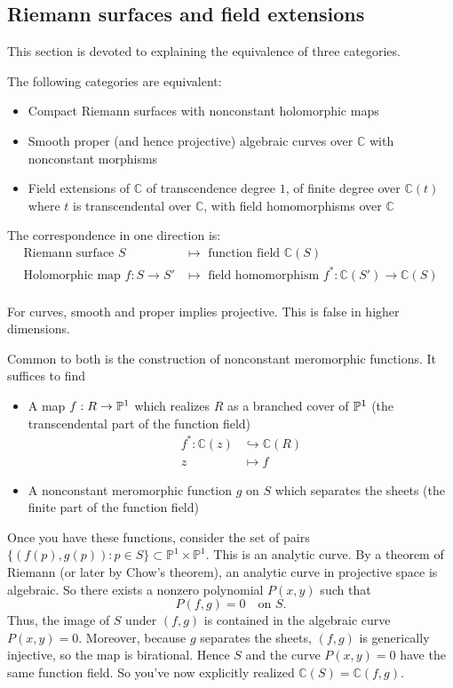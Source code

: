 \documentclass[12pt]{article}
\begin{document}
\subsection{Riemann surfaces and field extensions}
This section is devoted to explaining the equivalence of three categories.
\begin{theorem}
The following categories are equivalent:
\begin{itemize}
    \item Compact Riemann surfaces with nonconstant holomorphic maps
    \item Smooth proper (and hence projective) algebraic curves over $\mathbb{C}$ with nonconstant morphisms
    \item Field extensions of $\mathbb{C}$ of transcendence degree $1$, of finite degree over $\mathbb{C}(t)$ where $t$ is transcendental over $\mathbb{C}$, with field homomorphisms over $\mathbb{C}$
\end{itemize}

The correspondence in one direction is:
\begin{align*}
    \text{Riemann surface } S &\mapsto \text{ function field } \mathbb{C}(S) \\
    \text{Holomorphic map } f: S \to S' &\mapsto \text{ field homomorphism } f^*: \mathbb{C}(S') \to \mathbb{C}(S) \\
\end{align*}
\end{theorem}

\begin{remark}
    For curves, smooth and proper implies projective. This is false in higher dimensions.
\end{remark}

Common to both is the construction of nonconstant meromorphic functions. It suffices to find \begin{itemize}
    \item A map $f:R \to \P^1$ which realizes $R$ as a branched cover of $\P^1$ (the transcendental part of the function field) \begin{align*}
        f^*: \mathbb{C}(z) &\hookrightarrow \mathbb{C}(R) \\
        z &\mapsto f
    \end{align*}
    \item A nonconstant meromorphic function $g$ on $S$ which separates the sheets (the finite part of the function field)
\end{itemize}
Once you have these functions, consider the set of pairs $\{(f(p), g(p)) : p \in S\} \subset \mathbb{P}^1 \times \mathbb{P}^1$. This is an analytic curve. By a theorem of Riemann (or later by Chow's theorem), an analytic curve in projective space is algebraic. So there exists a nonzero polynomial $P(x,y)$ such that
\[
P(f,g) = 0 \quad \text{on } S.
\]
Thus, the image of $S$ under $(f,g)$ is contained in the algebraic curve $P(x,y)=0$. Moreover, because $g$ separates the sheets, $(f,g)$ is generically injective, so the map is birational. Hence $S$ and the curve $P(x,y)=0$ have the same function field. So you've now explicitly realized $\mathbb{C}(S) = \mathbb{C}(f,g)$.
\end{document}

